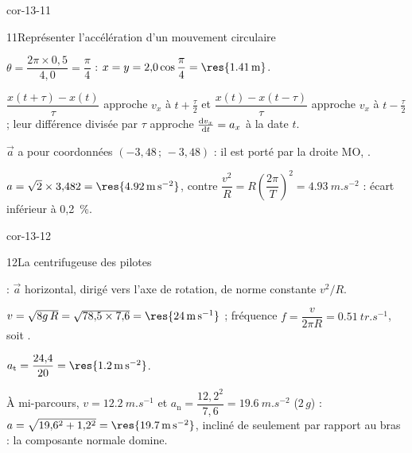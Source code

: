 \begin{blocLivre}{cor-13-11}
\begin{corrige}{11}{Représenter l'accélération d'un mouvement circulaire}
\begin{questions}
\item $\theta=\dfrac{2\pi\times0{,}5}{4{,}0}=\dfrac{\pi}{4}$ : $x=y=2{,}0\cos\dfrac{\pi}{4}=\res{\qty{1,41}{m}}$.
\item $\dfrac{x(t+\tau)-x(t)}{\tau}$ approche $v_x$ à $t+\frac{\tau}{2}$ et $\dfrac{x(t)-x(t-\tau)}{\tau}$ approche $v_x$ à
$t-\frac{\tau}{2}$ ; leur différence divisée par $\tau$ approche $\frac{\mathrm{d}v_x}{\mathrm{d}t}=a_x$ à la date $t$.
\item $\vec{a}$ a pour coordonnées $(-3{,}48\,;\,-3{,}48)$ : il est porté par la droite MO, .
\item $a=\sqrt{2}\times3{,}482=\res{\qty{4,92}{m.s^{-2}}}$, contre $\dfrac{v^2}{R}=R\left(\dfrac{2\pi}{T}\right)^2=\qty{4,93}{m.s^{-2}}$ :
écart inférieur à 0,2~\%.
\end{questions}
\end{corrige}
\end{blocLivre}
\begin{blocLivre}{cor-13-12}
\begin{corrige}{12}{La centrifugeuse des pilotes}
\begin{questions}
\item {} : $\vec{a}$ horizontal, dirigé vers l'axe de rotation, de norme constante
$v^2/R$.
\item $v=\sqrt{8g\,R}=\sqrt{78{,}5\times7{,}6}=\res{\qty{24}{m.s^{-1}}}$ ; fréquence
$f=\dfrac{v}{2\pi R}=\qty{0,51}{tr.s^{-1}}$, soit .
\item $a_\mathrm{t}=\dfrac{24{,}4}{20}=\res{\qty{1,2}{m.s^{-2}}}$.
\item À mi-parcours, $v=\qty{12,2}{m.s^{-1}}$ et $a_\mathrm{n}=\dfrac{12{,}2^2}{7{,}6}=\qty{19,6}{m.s^{-2}}$ ($2\,g$) :
$a=\sqrt{19{,}6^2+1{,}2^2}=\res{\qty{19,7}{m.s^{-2}}}$, incliné de  seulement par rapport au bras : la
composante normale domine.
\end{questions}
\end{corrige}
\end{blocLivre}
